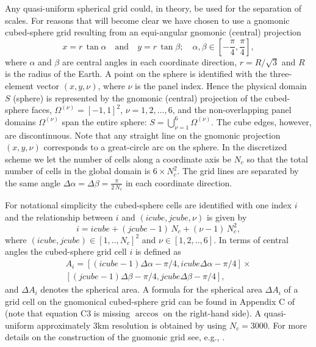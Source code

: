\documentclass[gmd]{copernicus}
\begin{document}
Any quasi-uniform spherical grid could, in theory, be used for the separation of scales. For reasons that will become clear we have chosen to use a gnomonic cubed-sphere grid resulting from an  equi-angular gnomonic (central) projection
\begin{equation}
\label{eq:GnomonicCoordinates}
x=r \, \tan \alpha \quad \mbox{and} \quad y=r \, \tan \beta; \quad
    \alpha,\beta \in \left[ -\frac{\pi}{4},\frac{\pi}{4}\right],
\end{equation}
%
%
\citep{RIP1996JCP} where $\alpha$ and $\beta$ are central angles in each coordinate direction, $r=R/\sqrt{3}$ and $R$ is the radius of the Earth. A point on the sphere is identified with the three-element vector $(x,y,\nu)$, where $\nu$ is the panel index. Hence the physical domain $S$ (sphere) is represented by the gnomonic (central) projection of the cubed-sphere faces, $\Omega^{(\nu)}=[-1,1]^2$, $\nu = 1,2,\dots,6$, and the non-overlapping panel domains $\Omega^{(\nu)}$ span the entire sphere: $S=\bigcup_{\nu=1}^6\Omega^{(\nu)}$. The cube  edges, however, are discontinuous. Note that any straight line on the gnomonic projection $(x,y,\nu)$  corresponds to a great-circle arc on the sphere. In the discretized scheme we let the number of cells along a coordinate axis be $N_c$ so that the total number of cells in the global domain is $6\times N_c^2$. The grid lines are separated by the same angle $\Delta \alpha=\Delta \beta=\tfrac{\pi}{2\, N_c}$ in each coordinate direction.

For notational simplicity the cubed-sphere cells are identified with one index $i$ and the relationship between $i$ and $(icube,jcube,\nu)$ is given by 
\begin{equation}
i=icube+(jcube-1)\, N_c+(\nu-1)\, N_c^2,
\end{equation}
where $(icube,jcube)\in [1,..,N_c]^2$ and $\nu \in [1,2,..,6]$. In terms of central angles the cubed-sphere grid cell $i$ is defined as
\begin{multline}
A_i= [(icube-1)\Delta \alpha-\pi/4,icube\Delta \alpha-\pi/4]\times\\
 [(jcube-1)\Delta \beta-\pi/4,jcube\Delta \beta-\pi/4],
\end{multline}
and $\Delta A_i$ denotes the spherical area. A formula for the spherical area $\Delta A_i$ of a grid cell on the gnomonical cubed-sphere grid can be found in Appendix C of \citet{LN2008MWR} (note that equation C3 is missing $\arccos$ on the right-hand side). A quasi-uniform approximately 3km resolution is obtained by using $N_c=3000$. For more details on the construction of the gnomonic grid see, e.g., \cite{LNU2010JCP}.
%
%
%
\end{document}
